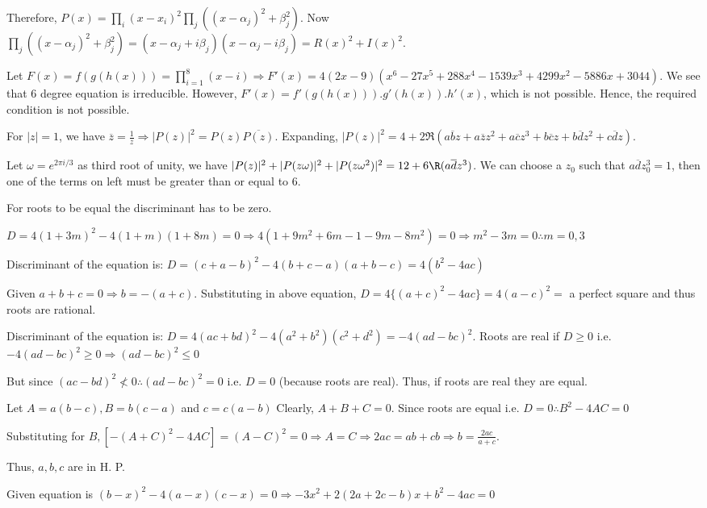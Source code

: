   Therefore, $P(x) = \prod_i(x - x_i)^2\prod_j((x - \alpha_j)^2 + \beta_j^2)$. Now $\prod_j((x - \alpha_j)^2
  + \beta_j^2) = (x - \alpha_j + i\beta_j)(x - \alpha_j - i\beta_j) = R(x)^2 + I(x)^2$.
\item Let $F(x) = f(g(h(x))) = \prod_{i=1}^8(x - i)\Rightarrow F'(x) = 4(2x - 9)(x^6 - 27x^5 + 288x^4
  -1539x^3 + 4299x^2 - 5886x + 3044)$. We see that $6$ degree equation is irreducible. However, $F'(x) =
  f'(g(h(x))).g'(h(x)).h'(x)$, which is not possible. Hence, the required condition is not possible.
\item For $|z| = 1$, we have $\overline{z} = \frac{1}{z} \Rightarrow |P(z)|^2 =
  P(z)\overline{P(z)}$. Expanding, $|P(z)|^2 = 4 + 2\Re(a\overline{b}z + a\overline{z}z^2 + a\overline{c}z^3
  + b\overline{c}z + b\overline{d}z^2 + c\overline{d}z)$.

  Let $\omega = e^{2\pi i/3}$ as third root of unity, we have $|P(z)|^2 + |P(z\omega)|^2 + |P(z\omega^2)|^2
  = 12 + 6\R(a\overline{d}z^3)$. We can choose a $z_0$ such that $a\overline{d}z_0^3 = 1$, then one of the
  terms on left must be greater than or equal to $6$.
\item For roots to be equal the discriminant has to be zero.

   $D = 4(1 + 3m)^2 - 4(1 + m)(1 + 8m) = 0\Rightarrow 4(1 + 9m^2 + 6m - 1 - 9m -8m^2) = 0\Rightarrow m^2 -
  3m = 0 \therefore m = 0, 3$
\item Discriminant of the equation is: $D = (c + a - b)^2 - 4(b + c - a)(a + b -c) = 4(b^2 - 4ac)$

  Given $a + b + c = 0 \Rightarrow b = -(a + c).$ Substituting in above equation, $D = 4\{(a + c)^2 - 4ac\}
  = 4(a - c)^2 =$ a perfect square and thus roots are rational.
\item Discriminant of the equation is: $D = 4(ac + bd)^2 - 4(a^2 + b^2)(c^2 + d^2) = -4(ad - bc)^2$. Roots
  are real if $D\geq 0$ i.e. $-4(ad - bc)^2 \geq 0 \Rightarrow (ad - bc)^2 \leq 0$

  But since $(ac - bd)^2 \nless 0 \therefore (ad - bc)^2 = 0$ i.e. $D = 0$ (because roots are real). Thus,
  if roots are real they are equal.
\item Let $A = a(b - c), B = b(c - a)$ and $c = c(a - b)$ Clearly, $A + B + C = 0$. Since roots are equal
  i.e. $D = 0 \therefore B^2 - 4AC = 0$

  Substituting for $B, [-(A + C)^2 - 4AC] = (A - C)^2 = 0 \Rightarrow A = C \Rightarrow 2ac = ab + cb
  \Rightarrow b = \frac{2ac}{a + c}$.

  Thus, $a, b, c$ are in H. P.
\item Given equation is $(b - x)^2 - 4(a - x)(c - x) = 0\Rightarrow -3x^2 + 2(2a + 2c - b)x + b^2 - 4ac = 0$

